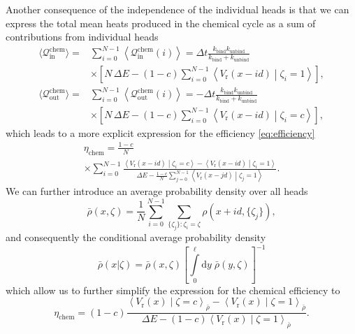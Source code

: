 \documentclass[aps,pre,twocolumn,showpacs,showkeys,superscriptaddress,floatfix]{revtex4-1}
\newcommand{\rmd}{{\mathrm d}}
\begin{document}
Another consequence of the independence of the individual heads 
is that we can express the total mean heats produced in the chemical cycle as a sum of contributions from individual heads
\begin{align*}
\langle \mathcal Q_\text{in}^\text{chem} \rangle 
=& \sum\limits_{i=0}^{N-1} \left\langle \mathcal Q_\text{in}^\text{chem}(i) \right\rangle 
= \Delta t \frac{ k_\text{bind} k_\text{unbind} }{ k_\text{bind} + k_\text{unbind} } 
\\ &\times
\left[ N \, \Delta E 
- (1-c) \sum\limits_{i=0}^{N-1} \left\langle V_\text{r}(x - i d ) \middle| \zeta_i = 1 \right\rangle 
\right] ,  
\\
\langle \mathcal Q^\text{chem}_\text{out} \rangle 
=& \sum\limits_{i=0}^{N-1} \left\langle \mathcal Q_\text{out}^\text{chem}(i) \right\rangle 
= - \Delta t \frac{ k_\text{bind} k_\text{unbind} }{ k_\text{bind} + k_\text{unbind} } 
\\ &\times
\left[ N \, \Delta E 
- (1-c) \sum\limits_{i=0}^{N-1} \left\langle V_\text{r}(x - i d ) \middle| \zeta_i = c \right\rangle  
\right] , 
\end{align*}
which leads to a more explicit expression for the efficiency \eqref{eq:efficiency} 
\begin{multline*}
\eta_\text{chem} = \frac{1-c}{N}
\\ \times
\sum\limits_{i=0}^{N-1} \frac{ \left\langle V_\text{r}(x-id) \middle| \zeta_i = c \right\rangle - \left\langle V_\text{r}( x -id ) \middle| \zeta_i = 1 \right\rangle }
{ \Delta E - \frac{1-c}{N} \sum\limits_{j=0}^{N-1} \left\langle V_\text{r}(x-jd) \middle| \zeta_j = 1 \right\rangle } 
. 
\end{multline*}
We can further introduce an average probability density over all heads 
\begin{equation}
\bar{\rho}(x,\zeta) = \frac{1}{N} \sum\limits_{i=0}^{N-1} \sum\limits_{ \{ \zeta_j \} : \zeta_i = \zeta } \rho( x + i d, \{ \zeta_j \} ) ,
\label{eq:eff_distribution}
\end{equation}
and consequently the conditional average probability density
\begin{equation}
\bar{\rho}(x|\zeta) = \bar{\rho}(x,\zeta) \left[ \int\limits_0^\ell \rmd y \; \bar{\rho}(y,\zeta) \right]^{-1}
\label{eq:cond_prob}
\end{equation}
which allow us to further simplify the expression for the chemical efficiency to 
\begin{equation}
\eta_\text{chem} = (1-c)
\frac{ \left\langle V_\text{r}(x) \middle| \zeta = c \right\rangle_{\bar{\rho}} - \left\langle V_\text{r}(x) \middle| \zeta = 1 \right\rangle_{\bar{\rho}} }
{ \Delta E - (1-c) \left\langle V_\text{r}(x) \middle| \zeta = 1 \right\rangle_{\bar{\rho}} } 
. 
\label{eq:eta}
\end{equation}
\end{document}

